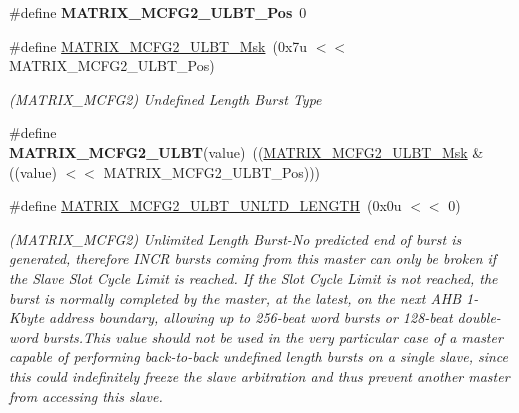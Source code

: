\begin{DoxyCompactItemize}
\mbox{\label{group__SAMS70__MATRIX_ga6621e585257588f6811943af33ad1055}} 
\#define {\bfseries M\+A\+T\+R\+I\+X\+\_\+\+M\+C\+F\+G2\+\_\+\+U\+L\+B\+T\+\_\+\+Pos}~0
\item 
\mbox{\label{group__SAMS70__MATRIX_ga6e43d81dd66d25f8c53c77564b03754b}} 
\#define \mbox{\hyperlink{group__SAMS70__MATRIX_ga6e43d81dd66d25f8c53c77564b03754b}{M\+A\+T\+R\+I\+X\+\_\+\+M\+C\+F\+G2\+\_\+\+U\+L\+B\+T\+\_\+\+Msk}}~(0x7u $<$$<$ M\+A\+T\+R\+I\+X\+\_\+\+M\+C\+F\+G2\+\_\+\+U\+L\+B\+T\+\_\+\+Pos)
\begin{DoxyCompactList}\small\item\em (M\+A\+T\+R\+I\+X\+\_\+\+M\+C\+F\+G2) Undefined Length Burst Type \end{DoxyCompactList}\item 
\mbox{\label{group__SAMS70__MATRIX_ga75993e1b69a7a75b49b37435e0816f88}} 
\#define {\bfseries M\+A\+T\+R\+I\+X\+\_\+\+M\+C\+F\+G2\+\_\+\+U\+L\+BT}(value)~((\mbox{\hyperlink{group__SAMS70__MATRIX_ga6e43d81dd66d25f8c53c77564b03754b}{M\+A\+T\+R\+I\+X\+\_\+\+M\+C\+F\+G2\+\_\+\+U\+L\+B\+T\+\_\+\+Msk}} \& ((value) $<$$<$ M\+A\+T\+R\+I\+X\+\_\+\+M\+C\+F\+G2\+\_\+\+U\+L\+B\+T\+\_\+\+Pos)))
\item 
\mbox{\label{group__SAMS70__MATRIX_gab0d73af8b260e70526a6ee0034404e92}} 
\#define \mbox{\hyperlink{group__SAMS70__MATRIX_gab0d73af8b260e70526a6ee0034404e92}{M\+A\+T\+R\+I\+X\+\_\+\+M\+C\+F\+G2\+\_\+\+U\+L\+B\+T\+\_\+\+U\+N\+L\+T\+D\+\_\+\+L\+E\+N\+G\+TH}}~(0x0u $<$$<$ 0)
\begin{DoxyCompactList}\small\item\em (M\+A\+T\+R\+I\+X\+\_\+\+M\+C\+F\+G2) Unlimited Length Burst-\/\+No predicted end of burst is generated, therefore I\+N\+CR bursts coming from this master can only be broken if the Slave Slot Cycle Limit is reached. If the Slot Cycle Limit is not reached, the burst is normally completed by the master, at the latest, on the next A\+HB 1-\/Kbyte address boundary, allowing up to 256-\/beat word bursts or 128-\/beat double-\/word bursts.\+This value should not be used in the very particular case of a master capable of performing back-\/to-\/back undefined length bursts on a single slave, since this could indefinitely freeze the slave arbitration and thus prevent another master from accessing this slave. \end{DoxyCompactList}\item 
$$
\end{DoxyCompactItemize}
